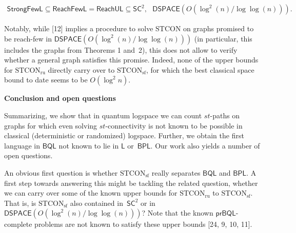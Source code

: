 \documentclass[10pt,a4paper]{article}
\begin{document}
\[\begin{gathered}
\displaystyle\mathsf{StrongFewL}\subseteq\mathsf{ReachFewL}=\mathsf{ReachUL}\subseteq\mathsf{SC}^{2},\text{ }\mathsf{DSPACE}(O(\log^{2}(n)/\log\log(n))).
\end{gathered}\]


Notably, while [12] implies a procedure to solve $\mathrm{STCON}$ on graphs promised to be reach-few in $\mathsf{DSPACE}(O(\log^{2}(n)/\log\log(n)))$ (in particular, this includes the graphs from Theorems 1 and 2), this does not allow to verify whether a general graph satisfies this promise.
Indeed, none of the upper bounds for $\mathrm{STCON}_{\mathrm{ru}}$ directly carry over to $\mathrm{STCON}_{\mathrm{sf}}$, for which the best classical space bound to date seems to be $O(\log^{2}n)$.\par





\par\medskip\noindent\textbf{Conclusion and open questions}\par




Summarizing, we show that in quantum logspace we can count $st$-paths on graphs for which even solving $st$-connectivity is not known to be possible in classical (deterministic or randomized) logspace.
Further, we obtain the first language in $\mathsf{BQL}$ not known to lie in $\mathsf{L}$ or $\mathsf{BPL}$.
Our work also yields a number of open questions.\par




An obvious first question is whether $\mathrm{STCON}_{\mathrm{sf}}$ really separates $\mathsf{BQL}$ and $\mathsf{BPL}$.
A first step towards answering this might be tackling the related question, whether we can carry over some of the known upper bounds for $\mathrm{STCON}_{\mathrm{ru}}$ to $\mathrm{STCON}_{\mathrm{sf}}$. That is, is $\mathrm{STCON}_{\mathrm{sf}}$ also contained in $\mathsf{SC}^{2}$ or in $\mathsf{DSPACE}(O(\log^{2}(n)/\log\log(n)))$?
Note that the known $\mathsf{prBQL}$-complete problems are not known to satisfy these upper bounds [24, 9, 10, 11].\par
\end{document}
